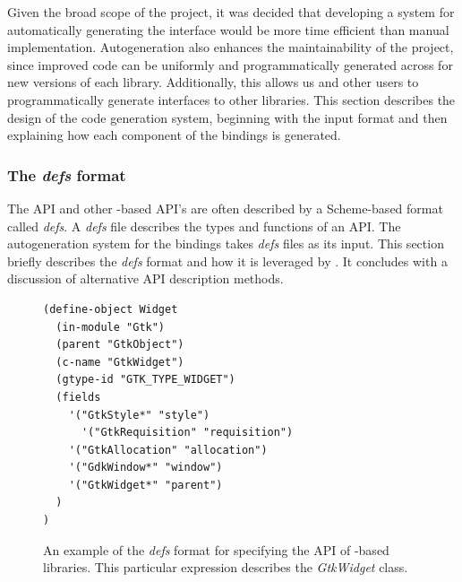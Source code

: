 \documentclass[article]{jss}
\begin{document}
Given the broad scope of the project, it was decided that developing a
system for automatically generating the interface would be more time
efficient than manual implementation. Autogeneration also enhances the
maintainability of the project, since improved code can be uniformly
and programmatically generated across for new versions of each
library. Additionally, this allows us and other users to
programmatically generate interfaces to other libraries. This section
describes the design of the code generation system, beginning with the
input format and then explaining how each component of the bindings is
generated.

\subsubsection[The defs format]{The \emph{defs} format}

The  API and other -based API's are often
described by
a Scheme-based \citep{scheme} format called \emph{defs}. A \emph{defs} file describes the types and functions of an API. The autogeneration system for the  bindings takes \emph{defs} files as its input. This section briefly describes the \emph{defs} format and how it is leveraged by . It concludes
with a discussion of alternative API description methods.

\begin{figure}
\begin{verbatim}
(define-object Widget
  (in-module "Gtk")
  (parent "GtkObject")
  (c-name "GtkWidget")
  (gtype-id "GTK_TYPE_WIDGET")
  (fields
    '("GtkStyle*" "style")
	  '("GtkRequisition" "requisition")
    '("GtkAllocation" "allocation")
    '("GdkWindow*" "window")
    '("GtkWidget*" "parent")
  )
)
\end{verbatim}
\caption{\label{fig:defs}An example of the \emph{defs} format for specifying the API of -based libraries. This particular expression describes the \emph{GtkWidget} class.}
\end{figure}
\end{document}
